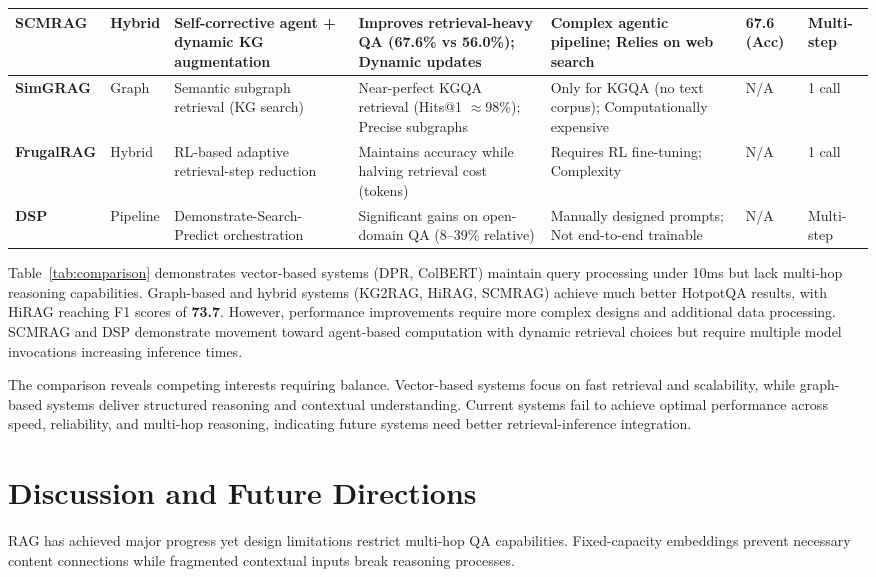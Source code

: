 \documentclass[runningheads]{llncs}
\begin{document}
\begin{table}[ht]
{\begin{tabular}{p{2cm} p{1.5cm} p{3.5cm} p{3.5cm} p{3.5cm} p{2cm} p{2cm}}
\midrule
\textbf{SCMRAG} \cite{78} & Hybrid & Self-corrective agent + dynamic KG augmentation & Improves retrieval-heavy QA (67.6\% vs 56.0\%); Dynamic updates & Complex agentic pipeline; Relies on web search & 67.6 (Acc) & Multi-step \\
\midrule
\textbf{SimGRAG} \cite{55} & Graph & Semantic subgraph retrieval (KG search) & Near-perfect KGQA retrieval (Hits@1 $\approx$98\%); Precise subgraphs & Only for KGQA (no text corpus); Computationally expensive & N/A & 1 call \\
\midrule
\textbf{FrugalRAG} \cite{73} & Hybrid & RL-based adaptive retrieval-step reduction & Maintains accuracy while halving retrieval cost (tokens) & Requires RL fine-tuning; Complexity & N/A & 1 call \\
\midrule
\textbf{DSP} \cite{72} & Pipeline & Demonstrate-Search-Predict orchestration & Significant gains on open-domain QA (8--39\% relative) & Manually designed prompts; Not end-to-end trainable & N/A & Multi-step \\
\bottomrule
\end{tabular}%
}
\end{table}

Table~\ref{tab:comparison} demonstrates vector-based systems (DPR, ColBERT) maintain query processing under 10ms but lack multi-hop reasoning capabilities. Graph-based and hybrid systems (KG2RAG, HiRAG, SCMRAG) achieve much better HotpotQA results, with HiRAG reaching F1 scores of \textbf{73.7}. However, performance improvements require more complex designs and additional data processing. SCMRAG and DSP demonstrate movement toward agent-based computation with dynamic retrieval choices but require multiple model invocations increasing inference times.

The comparison reveals competing interests requiring balance. Vector-based systems focus on fast retrieval and scalability, while graph-based systems deliver structured reasoning and contextual understanding. Current systems fail to achieve optimal performance across speed, reliability, and multi-hop reasoning, indicating future systems need better retrieval-inference integration.


\section{Discussion and Future Directions}

RAG has achieved major progress yet design limitations restrict multi-hop QA capabilities. Fixed-capacity embeddings prevent necessary content connections while fragmented contextual inputs break reasoning processes.
\end{document}
